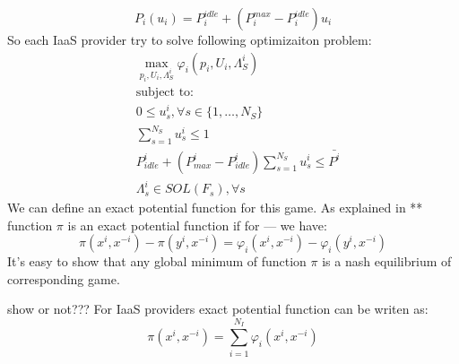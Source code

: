 \documentclass[conference]{IEEEtran}
\begin{document}
    \begin{equation}
      P_i(u_i) = P_i^{idle} + (P_i^{max} - P_i^{idle}) u_i
    \end{equation}
    So each IaaS provider try to solve following optimizaiton problem:
    \begin{subequations}
      \begin{align}
        &\max_{p_i, U_i,\Lambda^i_S} \varphi_i(p_i, U_i, \Lambda^i_S)\\
        &\text{subject to:} \nonumber\\
        &0 \le u_s^i, \forall s \in \{1, \hdots, N_S\} \\
        &\sum_{s=1}^{N_S}u_s^i \le 1 \\
        &P_{idle}^i + (P_{max}^i - P_{idle}^i)\sum_{s=1}^{N_S}u_s^i \le \bar{P^i} \\
        &\Lambda_s^i \in SOL(F_s), \forall s
      \end{align}
    \end{subequations}
    We can define an exact potential function for this game.
    As explained in ** function $\pi$ is an exact potential function if for --- we have:
    \begin{equation}
      \pi(x^i,x^{-i}) - \pi(y^i,x^{-i}) = \varphi_i(x^i,x^{-i}) - \varphi_i(y^i,x^{-i})
    \end{equation}
    It's easy to show that any global minimum of function $\pi$ is a nash equilibrium of corresponding game.

    show or not???
    For IaaS providers exact potential function can be writen as:
    \begin{equation}
      \pi(x^i, x^{-i}) = \sum_{i=1}^{N_I} \varphi_i(x^i, x^{-i})
    \end{equation}
\end{document}
